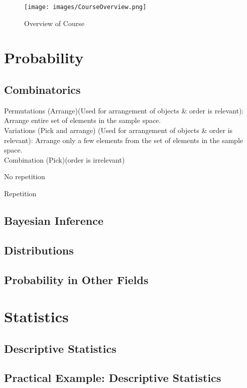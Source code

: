 \documentclass[12pt, a4paper]{article}
\begin{document}
\pagebreak

\begin{figure}[H]
    \begin{center}
        \texttt{[image: images/CourseOverview.png]}
        \caption{Overview of Course}
        \label{CourseOverview}
    \end{center}
\end{figure}

\pagebreak

\section{Probability}
\subsection{Combinatorics}
Permutations (Arrange)(Used for arrangement of objects \& order is relevant): Arrange entire set of elements in the sample space.\\
Variations (Pick and arrange) (Used for arrangement of objects \& order is relevant): Arrange only a few elements from the set of elements in the sample space.\\
Combination (Pick)(order is irrelevant)

No repetition

Repetition 
\subsection{Bayesian Inference}
\subsection{Distributions}
\subsection{Probability in Other Fields}
\pagebreak

\section{Statistics}
\subsection{Descriptive Statistics}
\subsection{Practical Example: Descriptive Statistics}
\end{document}
